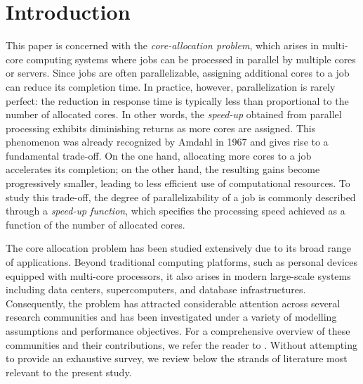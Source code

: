 \documentclass[11pt]{article}
\newcommand{\jpblue}[1]{{\color{blue} #1}}
\theoremstyle{remark}
\theoremstyle{definition}
\numberwithin{equation}{section}
\begin{document}

\section{Introduction} \label{section: Introduction}
This paper is concerned with the \emph{core-allocation problem}, which arises in multi-core computing systems where jobs can be processed in parallel by multiple cores or servers. Since jobs are often parallelizable, assigning additional cores to a job can reduce its completion time. In practice, however, parallelization is rarely perfect: the reduction in response time is typically less than proportional to the number of allocated cores. In other words, the \emph{speed-up} obtained from parallel processing exhibits diminishing returns as more cores are assigned. This phenomenon was already recognized by Amdahl in 1967 \cite{amdahl1967} and gives rise to a fundamental trade-off. On the one hand, allocating more cores to a job accelerates its completion; on the other hand, the resulting gains become progressively smaller, leading to less efficient use of computational resources. To study this trade-off, the degree of parallelizability of a job is commonly described through a \emph{speed-up function}, which specifies the processing speed achieved as a function of the number of allocated cores.


The core allocation problem has been studied extensively due to its broad range of applications. Beyond traditional computing platforms, such as personal devices equipped with multi-core processors, it also arises in modern large-scale systems including data centers, supercomputers, and database infrastructures. Consequently, the problem has attracted considerable attention across several research communities and has been investigated under a variety of modelling assumptions and performance objectives. For a comprehensive overview of these communities and their contributions, we refer the reader to \cite[Chapter 3]{berg2022}. Without attempting to provide an exhaustive survey, we review below the strands of literature most relevant to the present study.

\end{document}
